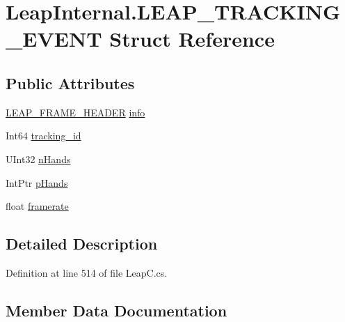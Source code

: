 \hypertarget{struct_leap_internal_1_1_l_e_a_p___t_r_a_c_k_i_n_g___e_v_e_n_t}{}\section{Leap\+Internal.\+L\+E\+A\+P\+\_\+\+T\+R\+A\+C\+K\+I\+N\+G\+\_\+\+E\+V\+E\+NT Struct Reference}
\label{struct_leap_internal_1_1_l_e_a_p___t_r_a_c_k_i_n_g___e_v_e_n_t}
\subsection*{Public Attributes}
\begin{DoxyCompactItemize}
\item 
\mbox{\hyperlink{struct_leap_internal_1_1_l_e_a_p___f_r_a_m_e___h_e_a_d_e_r}{L\+E\+A\+P\+\_\+\+F\+R\+A\+M\+E\+\_\+\+H\+E\+A\+D\+ER}} \mbox{\hyperlink{struct_leap_internal_1_1_l_e_a_p___t_r_a_c_k_i_n_g___e_v_e_n_t_a05e4cb8a43cac50fbe03886fa71fec99}{info}}
\item 
Int64 \mbox{\hyperlink{struct_leap_internal_1_1_l_e_a_p___t_r_a_c_k_i_n_g___e_v_e_n_t_a4c75e2c555e3d5452e1fe5d0355350f5}{tracking\+\_\+id}}
\item 
U\+Int32 \mbox{\hyperlink{struct_leap_internal_1_1_l_e_a_p___t_r_a_c_k_i_n_g___e_v_e_n_t_a010ed707ae48033d9e2543028617e623}{n\+Hands}}
\item 
Int\+Ptr \mbox{\hyperlink{struct_leap_internal_1_1_l_e_a_p___t_r_a_c_k_i_n_g___e_v_e_n_t_a5f9ee31b44389603d9a014bc00a655ae}{p\+Hands}}
\item 
float \mbox{\hyperlink{struct_leap_internal_1_1_l_e_a_p___t_r_a_c_k_i_n_g___e_v_e_n_t_a5d7fd5f408cc47540f1ea12d61a9f002}{framerate}}
\end{DoxyCompactItemize}


\subsection{Detailed Description}


Definition at line 514 of file Leap\+C.\+cs.



\subsection{Member Data Documentation}
\mbox{\label{struct_leap_internal_1_1_l_e_a_p___t_r_a_c_k_i_n_g___e_v_e_n_t_a5d7fd5f408cc47540f1ea12d61a9f002}} 
